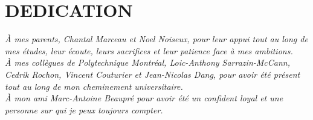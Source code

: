 \chapter*{DEDICATION}\thispagestyle{headings}
\begin{flushright}
  \itshape
  À mes parents, Chantal Marceau et Noel Noiseux, pour leur appui tout au long de mes études, leur écoute, leurs sacrifices et leur patience face à mes ambitions.\\
  À mes collègues de Polytechnique Montréal, Loic-Anthony Sarrazin-McCann, Cedrik Rochon, Vincent Couturier et Jean-Nicolas Dang, pour avoir été présent tout au long de mon cheminement universitaire.\\
  À mon ami Marc-Antoine Beaupré pour avoir été un confident loyal et une personne sur qui je peux toujours compter.\\
\end{flushright}
